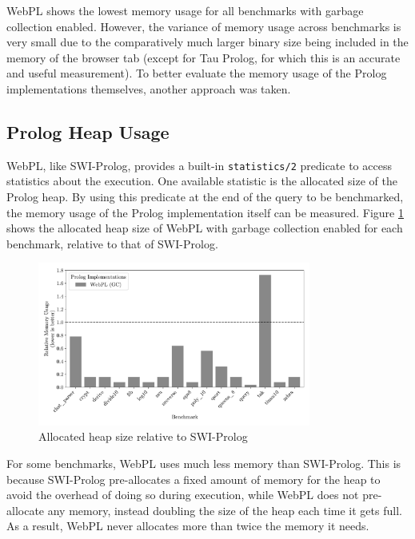 WebPL shows the lowest memory usage for all benchmarks with garbage collection enabled. However, the variance of memory usage across benchmarks is very small due to the comparatively much larger binary size being included in the memory of the browser tab (except for Tau Prolog, for which this is an accurate and useful measurement). To better evaluate the memory usage of the Prolog implementations themselves, another approach was taken.

\subsection{Prolog Heap Usage}

\label{sec:prolog-heap-usage}

WebPL, like SWI-Prolog, provides a built-in \texttt{statistics/2} predicate to access statistics about the execution. One available statistic is the allocated size of the Prolog heap. By using this predicate at the end of the query to be benchmarked, the memory usage of the Prolog implementation itself can be measured. Figure \ref{fig:heap-usage} shows the allocated heap size of WebPL with garbage collection enabled for each benchmark, relative to that of SWI-Prolog.

\begin{figure}[t]
\centering
\includegraphics[width=0.8\textwidth]{relative_memory_builtin.pdf}
\caption{Allocated heap size relative to SWI-Prolog}
\label{fig:heap-usage}
\end{figure}

For some benchmarks, WebPL uses much less memory than SWI-Prolog. This is because SWI-Prolog pre-allocates a fixed amount of memory for the heap to avoid the overhead of doing so during execution, while WebPL does not pre-allocate any memory, instead doubling the size of the heap each time it gets full. As a result, WebPL never allocates more than twice the memory it needs.

